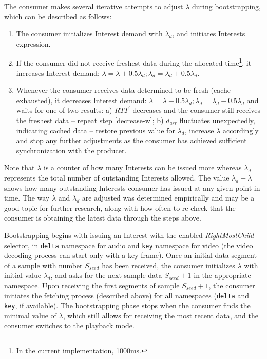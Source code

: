 \documentclass{icn/sig-alternate-2013} %
\newcommand{\wConcept}{Interest demand}
\begin{document}
The consumer makes several iterative attempts to adjust $\lambda$ during bootstrapping, which can be described as follows:
\begin{enumerate}
\item The consumer initializes \wConcept{} with $\lambda_d$, and initiates Interests expression.
\item If the consumer did not receive freshest data during the allocated time\footnote{In the current implementation, 1000ms.}, it increases \wConcept{}: $\lambda=\lambda+0.5\lambda_d; \lambda_d = \lambda_d+0.5\lambda_d$.
\item \label{decrease-w} Whenever the consumer receives data determined to be fresh (cache exhausted), it decreases \wConcept{}: $\lambda=\lambda-0.5\lambda_d; \lambda_d = \lambda_d-0.5\lambda_d$ and waits for one of two results:
a) $RTT^\prime$ decreases and the consumer still receives the freshest data -- repeat step \ref{decrease-w};
b) $d_{arr}$ fluctuates unexpectedly, indicating cached data -- restore previous value for $\lambda_d$, increase $\lambda$ accordingly and stop any further adjustments as the consumer has achieved sufficient synchronization with the producer.
\end{enumerate}

Note that $\lambda$ is a counter of how many Interests can be issued more whereas $\lambda_d$ represents the total number of outstanding Interests allowed. The value $\lambda_d-\lambda$ shows how many outstanding Interests consumer has issued at any given point in time. The way $\lambda$ and $\lambda_d$ are adjusted was determined empirically and may be a good topic for further research, along with how often to re-check that the consumer is obtaining the latest data through the steps above. 

Bootstrapping begins with issuing an Interest with the enabled \textit{RightMostChild} selector, in \texttt{delta} namespace for audio and \texttt{key} namespace for video (the video decoding process can start only with a key frame). %
Once an initial data segment of a sample with number $S_{seed}$ has been received, the consumer initializes $\lambda$ with initial value $\lambda_d$, and asks for the next sample data $S_{seed}+1$ in the appropriate namespace. Upon receiving the first segments of sample $S_{seed}+1$, the consumer initiates the fetching process (described above) for all namespaces (\texttt{delta} and \texttt{key}, if available). The bootstrapping phase stops when the consumer finds the minimal value of $\lambda$, which still allows for receiving the most recent data, and the consumer switches to the playback mode.
\end{document}
